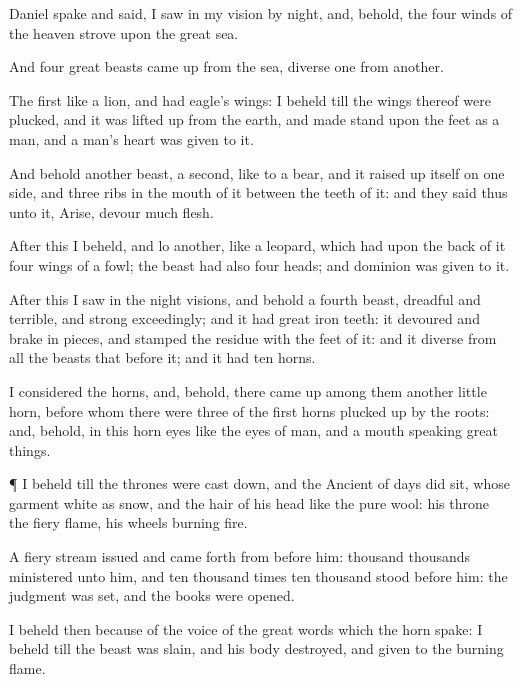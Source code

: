 {Daniel
spake and
said, I
saw in my
vision
by
night, and,
behold, the
four
winds of the
heaven
strove upon the
great
sea.

And
four
great
beasts came
up
from the
sea,
diverse
one
from
another.

The
first
{} like a
lion, and had
eagle’s
wings: I
beheld
till the
wings thereof were
plucked, and it was lifted
up
from the
earth, and made
stand
upon the
feet as a
man, and a
man’s
heart was
given to it.

And
behold
another
beast, a
second,
like to a
bear, and it raised
up itself on
one
side, and
{}
three
ribs in the
mouth of it
between the
teeth of it: and they
said
thus unto it,
Arise,
devour
much
flesh.

After
this I
beheld, and
lo
another, like a
leopard, which had
upon the
back of it
four
wings of a
fowl; the
beast had also
four
heads; and
dominion was
given to it.

After
this I
saw in the
night
visions, and
behold a
fourth
beast,
dreadful and
terrible, and
strong
exceedingly; and it had
great
iron
teeth: it
devoured and brake in
pieces, and
stamped the
residue with the
feet of it: and
it
{}
diverse
from
all the
beasts that
{}
before it; and it had
ten
horns.

I
considered the
horns, and,
behold, there came
up
among them
another
little
horn,
before whom there were
three
of the
first
horns plucked up by the
roots: and,
behold, in
this
horn
{}
eyes like the
eyes of
man, and a
mouth
speaking great
things.


\par }{\PP {}¶ I
beheld
till the
thrones were cast
down, and the
Ancient of
days did
sit, whose
garment
{}
white as
snow, and the
hair of his
head like the
pure
wool: his
throne
{} the
fiery
flame,
{} his
wheels
{}
burning
fire.

A
fiery
stream
issued and came
forth
from
before him:
thousand
thousands
ministered unto him, and ten
thousand times ten
thousand
stood
before him: the
judgment was
set, and the
books were
opened.

I
beheld
then
because of the
voice of the
great
words which the
horn
spake: I
beheld
{}
till the
beast was
slain, and his
body
destroyed, and
given to the
burning
flame.

}
